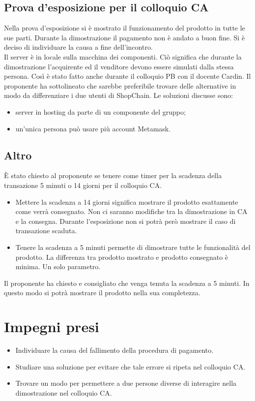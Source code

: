 \documentclass[a4paper, 12pt]{article}
\begin{document}
\subsection{Prova d'esposizione per il colloquio CA}
Nella prova d'esposizione si è mostrato il funzionamento del prodotto in tutte le sue parti. Durante la dimostrazione il pagamento non è andato a buon fine. Si è deciso di individuare la causa a fine dell'incontro. \\
Il server è in locale sulla macchina dei componenti. Ciò significa che durante la dimostrazione l'acquirente ed il venditore devono essere simulati dalla stessa persona. Così è stato fatto anche durante il colloquio PB con il docente Cardin.
Il proponente ha sottolineato che sarebbe preferibile trovare delle alternative in modo da differenziare i due utenti di ShopChain. Le soluzioni discusse sono: 
\begin{itemize}
	\item server in hosting da parte di un componente del gruppo;
	\item un'unica persona può usare più account Metamask.
\end{itemize}

\subsection{Altro}
È stato chiesto al proponente se tenere come timer per la scadenza della transazione 5 minuti o 14 giorni per il colloquio CA.
\begin{itemize}
	\item Mettere la scadenza a 14 giorni significa mostrare il prodotto esattamente come verrà consegnato. Non ci saranno modifiche tra la dimostrazione in CA e la consegna. Durante l'esposizione non si potrà però mostrare il caso di transazione scaduta.
	\item Tenere la scadenza a 5 minuti permette di dimostrare tutte le funzionalità del prodotto. La differenza tra prodotto mostrato e prodotto consegnato è minima. Un solo parametro.
\end{itemize}
Il proponente ha chiesto e consigliato che venga tenuta la scadenza a 5 minuti. In questo modo si potrà mostrare il prodotto nella sua completezza.

\section{Impegni presi}
\begin{itemize}
\item Individuare la causa del fallimento della procedura di pagamento.
\item Studiare una soluzione per evitare che tale errore si ripeta nel colloquio CA.
\item Trovare un modo per permettere a due persone diverse di interagire nella dimostrazione nel colloquio CA.
\end{itemize}
\end{document}
